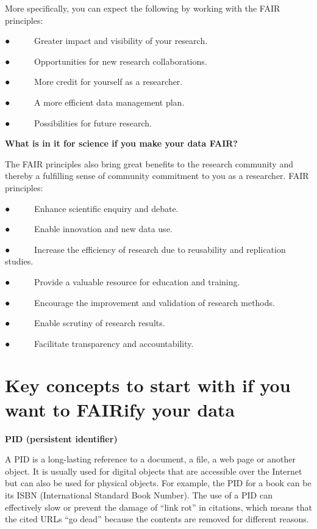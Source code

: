 \documentclass[
]{book}
\begin{document}
More specifically, you can expect the following by working with the FAIR principles:

● ~ ~ ~ Greater impact and visibility of your research.

● ~ ~ ~ Opportunities for new research collaborations.

● ~ ~ ~ More credit for yourself as a researcher.

● ~ ~ ~ A more efficient data management plan.

● ~ ~ ~ Possibilities for future research.

\textbf{What is in it for science if you make your data FAIR?}

The FAIR principles also bring great benefits to the research community and thereby a fulfilling sense of community commitment to you as a researcher. FAIR principles:

● ~ ~ ~ Enhance scientific enquiry and debate.

● ~ ~ ~ Enable innovation and new data use.

● ~ ~ ~ Increase the efficiency of research due to reusability and replication studies.

● ~ ~ ~ Provide a valuable resource for education and training.

● ~ ~ ~ Encourage the improvement and validation of research methods.

● ~ ~ ~ Enable scrutiny of research results.

● ~ ~ ~ Facilitate transparency and accountability.

\hypertarget{key-concepts-to-start-with-if-you-want-to-fairify-your-data}{%
\section{\texorpdfstring{\textbf{Key concepts to start with if you want to FAIRify your data}}{Key concepts to start with if you want to FAIRify your data}}\label{key-concepts-to-start-with-if-you-want-to-fairify-your-data}}

\textbf{PID (persistent identifier)}

A PID is a long-lasting reference to a document, a file, a web page or another object. It is usually used for digital objects that are accessible over the Internet but can also be used for physical objects. For example, the PID for a book can be its ISBN (International Standard Book Number). The use of a PID can effectively slow or prevent the damage of ``link rot'' in citations, which means that the cited URLs ``go dead'' because the contents are removed for different reasons.
\end{document}
